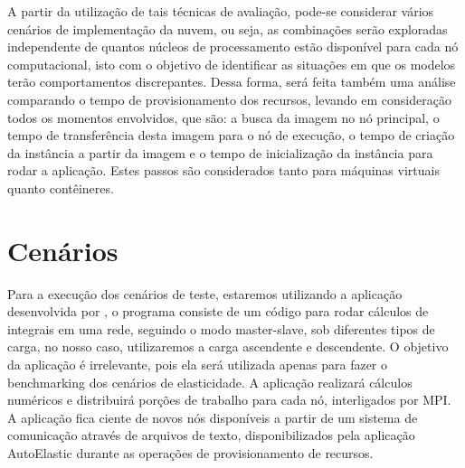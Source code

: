 \documentclass[twoside,english,brazilian]{UNISINOSartigo}
\begin{document}
\begin{itemize}
A partir da utilização de tais técnicas de avaliação, pode-se considerar vários cenários de implementação da nuvem, ou seja, as combinações serão exploradas independente de quantos núcleos de processamento estão disponível para cada nó computacional, isto com o objetivo de identificar as situações em que os modelos terão comportamentos discrepantes. Dessa forma, será feita também uma análise comparando o tempo de provisionamento dos recursos, levando em consideração todos os momentos envolvidos, que são: a busca da imagem no nó principal, o tempo de transferência desta imagem para o nó de execução, o tempo de criação da instância a partir da imagem e o tempo de inicialização da instância para rodar a aplicação. Estes passos são considerados tanto para máquinas virtuais quanto contêineres. 

\section{Cenários}
\label{cenarios}

Para a execução dos cenários de teste, estaremos utilizando a aplicação desenvolvida por , o programa consiste de um código para rodar cálculos de integrais em uma rede, seguindo o modo master-slave, sob diferentes tipos de carga, no nosso caso, utilizaremos a carga ascendente e descendente. O objetivo da aplicação é irrelevante, pois ela será utilizada apenas para fazer o benchmarking dos cenários de elasticidade. A aplicação realizará cálculos numéricos e distribuirá porções de trabalho para cada nó, interligados por MPI. A aplicação fica ciente de novos nós disponíveis a partir de um sistema de comunicação através de arquivos de texto, disponibilizados pela aplicação AutoElastic durante as operações de provisionamento de recursos.





\end{itemize}
\end{document}

